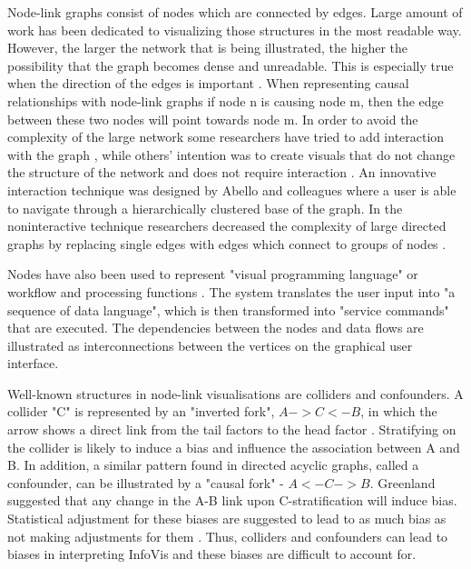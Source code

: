 \documentclass{l4proj}
\begin{document}
Node-link graphs consist of nodes which are connected by edges. Large amount of work has been dedicated to visualizing those structures in the most readable way. However, the larger the network that is being illustrated, the higher the possibility that the graph becomes dense and unreadable. This is especially true when the direction of the edges is important \cite{dwyer2013edge}. When representing causal relationships with node-link graphs if node n is causing node m, then the edge between these two nodes will point towards node m. In order to avoid the complexity of the large network some researchers have tried to add interaction with the graph \cite{gansner2005topological}, while others' intention was to create visuals that do not change the structure of the network and does not require interaction \cite{dwyer2013edge}. An innovative interaction technique was designed by Abello and colleagues \cite{abello2006ask} where a user is able to navigate through a hierarchically clustered base of the graph. In the noninteractive technique researchers decreased the complexity of large directed graphs by replacing single edges with edges which connect to groups of nodes \cite{dwyer2013edge}.  

Nodes have also been used to represent "visual programming language" or workflow and processing functions \cite{thattai2016systems}. The system translates the user input into "a sequence of data language", which is then transformed into "service commands" that are executed. The dependencies between the nodes and data flows are illustrated as interconnections between the vertices on the graphical user interface. 

Well-known structures in node-link visualisations are colliders and confounders. A collider "C" is represented by an "inverted fork", $A->C<-B$, in which the arrow shows a direct link from the tail factors to the head factor \cite{greenland2003quantifying}. Stratifying on the collider is likely to induce a bias and influence the association between A and B. In addition, a similar pattern found in directed acyclic graphs, called a confounder, can be illustrated by a "causal fork" - $A<-C-> B$. Greenland \cite{greenland2003quantifying} suggested that any change in the A-B link upon C-stratification will induce bias. Statistical adjustment for these biases are suggested to lead to as much bias as not making adjustments for them \cite{janszky2010janus}. Thus, colliders and confounders can lead to biases in interpreting InfoVis and these biases are difficult to account for.
\end{document}
